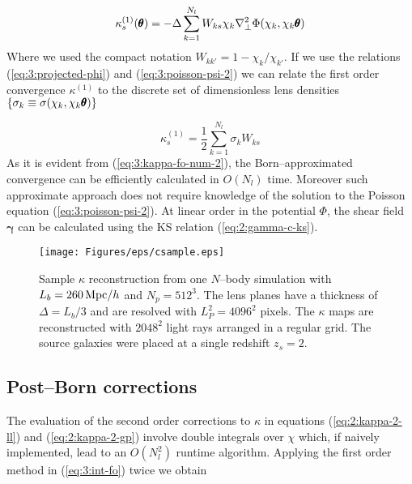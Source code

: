 \begin{equation}
\label{eq:3:kappa-fo-num-1}
\kappa^{(1)}_s(\pmb{\theta}) = -\Delta\sum_{k=1}^{N_l} W_{ks}\chi_k\nabla^2_\perp\Phi(\chi_k,\chi_k\pmb{\theta})
\end{equation} 
%
Where we used the compact notation $W_{kk'}=1-\chi_k/\chi_{k'}$. If we use the relations (\ref{eq:3:projected-phi}) and (\ref{eq:3:poisson-psi-2}) we can relate the first order convergence $\kappa^{(1)}$ to the discrete set of dimensionless lens densities $\{\sigma_k\equiv\sigma(\chi_k,\chi_k\pmb{\theta})\}$

\begin{equation}
\label{eq:3:kappa-fo-num-2}
\kappa^{(1)}_s = \frac{1}{2}\sum_{k=1}^{N_l} \sigma_k W_{ks}
\end{equation}
%
As it is evident from (\ref{eq:3:kappa-fo-num-2}), the Born--approximated convergence can be efficiently calculated in $O(N_l)$ time. Moreover such approximate approach does not require knowledge of the solution to the Poisson equation (\ref{eq:3:poisson-psi-2}). At linear order in the potential $\Phi$, the shear field $\pmb{\gamma}$ can be calculated using the KS relation (\ref{eq:2:gamma-c-ks}).  

\begin{figure}
\begin{center}
\texttt{[image: Figures/eps/csample.eps]}
\end{center}
\caption{Sample $\kappa$ reconstruction from one $N$--body simulation with $L_b=260\,{\rm Mpc}/h$ and $N_p=512^3$. The lens planes have a thickness of $\Delta=L_b/3$ and are resolved with $L_P^2=4096^2$ pixels. The $\kappa$ maps are reconstructed with $2048^2$ light rays arranged in a regular grid. The source galaxies were placed at a single redshift $z_s=2$.}
\label{fig:3:csample}
\end{figure}

\subsection{Post--Born corrections}
The evaluation of the second order corrections to $\kappa$ in equations (\ref{eq:2:kappa-2-ll}) and (\ref{eq:2:kappa-2-gp}) involve double integrals over $\chi$ which, if naively implemented, lead to an $O(N_l^2)$ runtime algorithm. Applying the first order method in (\ref{eq:3:int-fo}) twice we obtain

